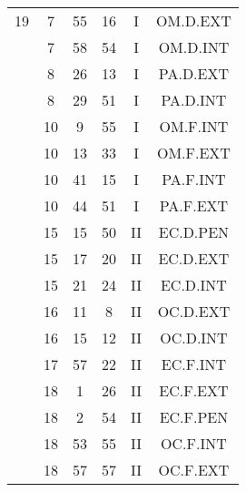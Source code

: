 \documentclass[12pt, a4paper]{article}
\begin{document}
\begin{multicols}{3}
{\begin{tabular}{c c c c c c}
	 	 	 	19 & 7 & 55 & 16 & I & OM.D.EXT\\%
	 	 	 	 & 7 & 58 & 54 & I & OM.D.INT\\%
	 	 	 	 & 8 & 26 & 13 & I & PA.D.EXT\\%
	 	 	 	 & 8 & 29 & 51 & I & PA.D.INT\\%
	 	 	 	 & 10 & 9 & 55 & I & OM.F.INT\\%
	 	 	 	 & 10 & 13 & 33 & I & OM.F.EXT\\%
	 	 	 	 & 10 & 41 & 15 & I & PA.F.INT\\%
	 	 	 	 & 10 & 44 & 51 & I & PA.F.EXT\\%
	 	 	 	 & 15 & 15 & 50 & II & EC.D.PEN\\%
	 	 	 	 & 15 & 17 & 20 & II & EC.D.EXT\\%
	 	 	 	 & 15 & 21 & 24 & II & EC.D.INT\\%
	 	 	 	 & 16 & 11 & 8 & II & OC.D.EXT\\%
	 	 	 	 & 16 & 15 & 12 & II & OC.D.INT\\%
	 	 	 	 & 17 & 57 & 22 & II & EC.F.INT\\%
	 	 	 	 & 18 & 1 & 26 & II & EC.F.EXT\\%
	 	 	 	 & 18 & 2 & 54 & II & EC.F.PEN\\%
	 	 	 	 & 18 & 53 & 55 & II & OC.F.INT\\%
	 	 	 	 & 18 & 57 & 57 & II & OC.F.EXT\\%
	 	 \end{tabular}
 	}
\end{multicols}
\end{document}
